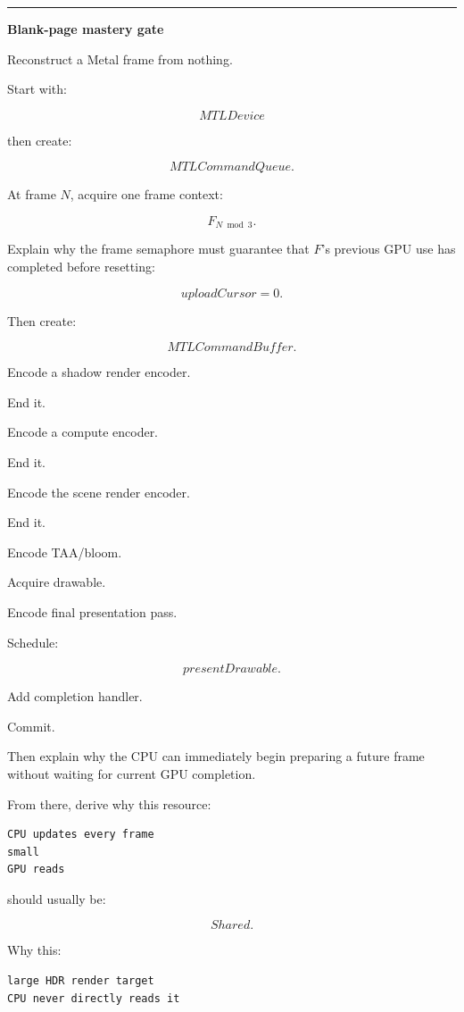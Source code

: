 \begin{center}\rule{0.5\linewidth}{0.5pt}\end{center}

\textbf{Blank-page mastery gate}

Reconstruct a Metal frame from nothing.

Start with:

\[
MTLDevice
\]

then create:

\[
MTLCommandQueue.
\]

At frame \(N\), acquire one frame context:

\[
F_{N\bmod3}.
\]

Explain why the frame semaphore must guarantee that \(F\)'s previous GPU use has completed before resetting:

\[
uploadCursor=0.
\]

Then create:

\[
MTLCommandBuffer.
\]

Encode a shadow render encoder.

End it.

Encode a compute encoder.

End it.

Encode the scene render encoder.

End it.

Encode TAA/bloom.

Acquire drawable.

Encode final presentation pass.

Schedule:

\[
presentDrawable.
\]

Add completion handler.

Commit.

Then explain why the CPU can immediately begin preparing a future frame without waiting for current GPU completion.

From there, derive why this resource:

\begin{verbatim}
CPU updates every frame
small
GPU reads
\end{verbatim}

should usually be:

\[
Shared.
\]

Why this:

\begin{verbatim}
large HDR render target
CPU never directly reads it
\end{verbatim}

